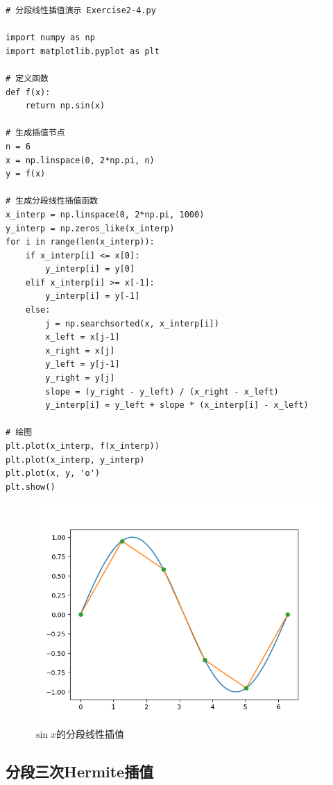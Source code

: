 \begin{lstlisting}
# 分段线性插值演示 Exercise2-4.py

import numpy as np
import matplotlib.pyplot as plt

# 定义函数
def f(x):
    return np.sin(x)

# 生成插值节点
n = 6
x = np.linspace(0, 2*np.pi, n)
y = f(x)

# 生成分段线性插值函数
x_interp = np.linspace(0, 2*np.pi, 1000)
y_interp = np.zeros_like(x_interp)
for i in range(len(x_interp)):
    if x_interp[i] <= x[0]:
        y_interp[i] = y[0]
    elif x_interp[i] >= x[-1]:
        y_interp[i] = y[-1]
    else:
        j = np.searchsorted(x, x_interp[i])
        x_left = x[j-1]
        x_right = x[j]
        y_left = y[j-1]
        y_right = y[j]
        slope = (y_right - y_left) / (x_right - x_left)
        y_interp[i] = y_left + slope * (x_interp[i] - x_left)

# 绘图
plt.plot(x_interp, f(x_interp))
plt.plot(x_interp, y_interp)
plt.plot(x, y, 'o')
plt.show()
\end{lstlisting}

\begin{figure}[h]
    \centering
    \includegraphics[width=1\linewidth]{Chapter2/graph/python/Figure2-3.png}
    \caption{$\sin{x}$的分段线性插值}
    \label{fig:分段线性插值}
\end{figure}

\subsection{分段三次Hermite插值}

